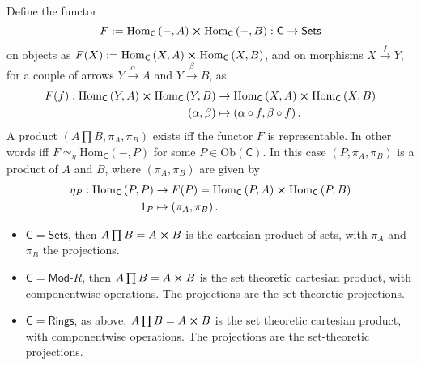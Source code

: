 \begin{prop}
	Define the functor 
	\begin{equation}
	F := \mathrm{Hom}_{\mathsf{C}} \left( -, A \right) \cross \mathrm{Hom}_{\mathsf{C}} \left( -, B \right): \mathsf{C} \to \mathsf{Sets}
	\end{equation} 
	on objects as $F(X) := \mathrm{Hom}_{\mathsf{C}} \left( X, A \right) \cross \mathrm{Hom}_{\mathsf{C}} \left( X, B \right)$, and on morphisms $X \xrightarrow{f} Y$, for a couple of arrows $Y \xrightarrow{\alpha} A$ and $Y \xrightarrow{\beta} B$, as
	\begin{align}
		F(f): \mathrm{Hom}_{\mathsf{C}} \left( Y, A \right) \cross \mathrm{Hom}_{\mathsf{C}} \left( Y, B \right) &\to \mathrm{Hom}_{\mathsf{C}} \left( X, A \right) \cross \mathrm{Hom}_{\mathsf{C}} \left( X, B \right) \\
		\left(\alpha, \beta\right) &\mapsto \left(\alpha \circ f, \beta \circ f \right)
	.\end{align} 
	A product $\left(A \prod B, \pi_A, \pi_B \right)$ exists iff the functor $F$ is representable.
	In other words iff $F \simeq_\eta \mathrm{Hom}_{\mathsf{C}} \left( -, P \right)$
	for some $P \in \mathrm{Ob} \left(\mathsf{C}\right)$.
	In this case $\left(P, \pi_A, \pi_B\right)$ is a product of $A$ and $B$,
	where $\left(\pi_A, \pi_B\right)$ are given by
	\begin{align}
		\eta_P: \mathrm{Hom}_{\mathsf{C}} \left( P, P \right) &\to F(P) =
		\mathrm{Hom}_{\mathsf{C}} \left( P, A \right) \cross 
		\mathrm{Hom}_{\mathsf{C}} \left( P, B \right)  \\
		1_P &\mapsto \left(\pi_A, \pi_B\right)
	.\end{align} 
\end{prop} 

\begin{ex}\leavevmode\vspace{-.2\baselineskip}
	\begin{itemize}
		\item $\mathsf{C} = \mathsf{Sets}$, then $A \prod B = A \cross B$ is the cartesian product of sets, with $\pi_A$ and $\pi_B$ the projections.
		\item $\mathsf{C} = \mathsf{Mod}\text{-}R$, then $A \prod B = A \cross B$ is the set theoretic cartesian product, with componentwise operations. The projections are the set-theoretic projections.
		\item $\mathsf{C} = \mathsf{Rings}$, as above, $A \prod B = A \cross B$ is the set theoretic cartesian product, with componentwise operations. The projections are the set-theoretic projections.
	\end{itemize}
\end{ex} 

